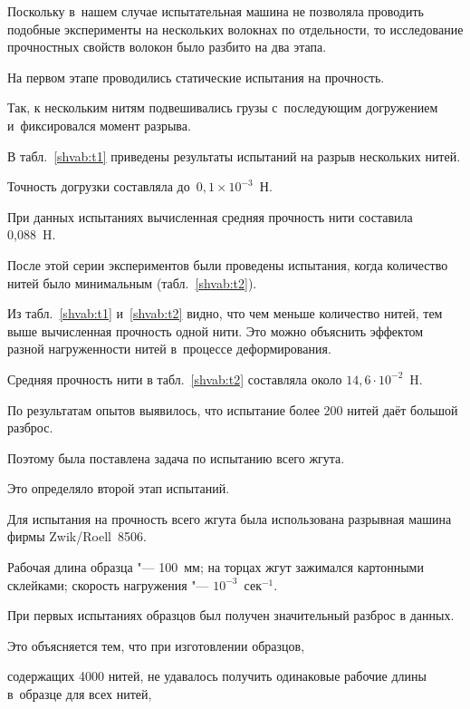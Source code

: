 Поскольку в~нашем случае испытательная машина не позволяла проводить подобные эксперименты на нескольких волокнах по отдельности, то исследование прочностных свойств волокон было разбито на два этапа. 

На первом этапе проводились статические испытания на прочность. 

Так, к нескольким нитям подвешивались грузы с~последующим догружением и~фиксировался момент разрыва.

В табл.~\ref{shvab:t1} приведены результаты испытаний на  разрыв нескольких нитей.

Точность догрузки составляла до~$0,1 \times 10^{-3}$~Н.









При данных испытаниях вычисленная средняя прочность нити составила 0,088~H.

После этой серии экспериментов были проведены испытания, когда количество нитей было минимальным (табл.~\ref{shvab:t2}).



Из табл.~\ref{shvab:t1} и~\ref{shvab:t2} видно, что чем меньше количество нитей, тем выше вычисленная прочность одной нити. Это можно объяснить эффектом разной нагруженности нитей в~процессе деформирования. 

Средняя прочность нити в табл.~\ref{shvab:t2} составляла около $14,6 \cdot 10^{-2}$~H.





По результатам опытов выявилось, что испытание более 200 нитей даёт большой разброс. 

Поэтому была поставлена задача по испытанию всего жгута. 

Это определяло второй этап испытаний.



Для испытания на прочность всего жгута была использована разрывная машина фирмы Zwik/Roell~8506. 

Рабочая длина образца "--- 100~мм; на торцах жгут зажимался картонными склейками; скорость нагружения "--- $10^{-3}$~сек$^{-1}$.



При первых испытаниях образцов был получен значительный разброс в данных.

Это объясняется тем, что при изготовлении образцов,

содержащих 4000 нитей, не удавалось получить одинаковые рабочие длины в~образце для всех нитей,

